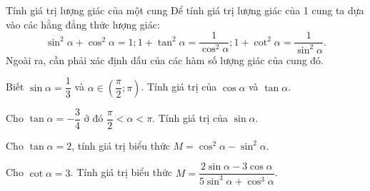 \begin{dang}{Tính giá trị lượng giác của một cung}
Để tính giá trị lượng giác của 1 cung ta dựa vào các hằng đẳng thức lượng giác:
$$\sin^2\alpha+\cos^2\alpha=1; 1+\tan^2\alpha=\dfrac{1}{\cos^2\alpha}; 1+\cot^2\alpha=\dfrac{1}{\sin^2\alpha}.$$
Ngoài ra, cần phải xác định dấu của các hàm số lượng giác của cung đó.
\end{dang}
\setcounter{vd}{0}
\begin{vd}%
Biết $\sin\alpha =\dfrac{1}{3}$ và $\alpha\in\left(\dfrac{\pi}{2};\pi\right)$. Tính giá trị của $\cos\alpha$ và $\tan\alpha$.
\end{vd}

\begin{vd}%
Cho $\tan \alpha=-\dfrac{3}{4}$ ở đó $\dfrac{\pi}{2}<\alpha<\pi$. Tính giá trị của  $\sin\alpha$.
\end{vd}

\begin{vd}%
Cho $\tan \alpha=2$, tính giá trị biểu thức $M=\cos^2\alpha-\sin^2\alpha$.
\end{vd}

\begin{vd}%
Cho $\cot\alpha =3$. Tính giá trị biểu thức $M=\dfrac{2\sin \alpha-3\cos\alpha}{5\sin^3 \alpha+\cos^3 \alpha}$.
\end{vd}

